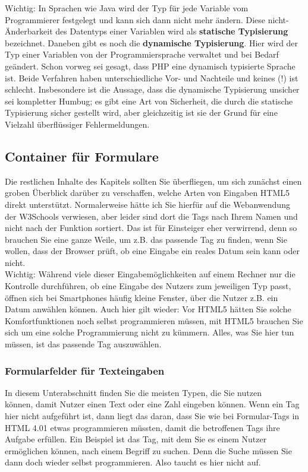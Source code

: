 Wichtig: In Sprachen wie Java wird der Typ für jede Variable vom Programmierer festgelegt und kann sich dann nicht mehr ändern. Diese nicht-Änderbarkeit des Datentyps einer Variablen wird als \textbf{statische Typisierung} bezeichnet. Daneben gibt es noch die \textbf{dynamische Typisierung}. Hier wird der Typ einer Variablen von der Programmiersprache verwaltet und bei Bedarf geändert. Schon vorweg sei gesagt, dass PHP eine dynamisch typisierte Sprache ist. Beide Verfahren haben unterschiedliche Vor- und Nachteile und keines (!) ist schlecht. Insbesondere ist die Aussage, dass die dynamische Typisierung unsicher sei kompletter Humbug; es gibt eine Art von Sicherheit, die durch die statische Typisierung sicher gestellt wird, aber gleichzeitig ist sie der Grund für eine Vielzahl überflüssiger Fehlermeldungen.

\subsection{Container für Formulare}

Die restlichen Inhalte des Kapitels sollten Sie überfliegen, um sich zunächst einen groben Überblick darüber zu verschaffen, welche Arten von Eingaben HTML5 direkt unterstützt. Normalerweise hätte ich Sie hierfür auf die Webanwendung der W3Schools verwiesen, aber leider sind dort die Tags nach Ihrem Namen und nicht nach der Funktion sortiert. Das ist für Einsteiger eher verwirrend, denn so brauchen Sie eine ganze Weile, um z.B. das passende Tag zu finden, wenn Sie wollen, dass der Browser prüft, ob eine Eingabe ein reales Datum sein kann oder nicht.\\

Wichtig: Während viele dieser Eingabemöglichkeiten auf einem Rechner nur die Kontrolle durchführen, ob eine Eingabe des Nutzers zum jeweiligen Typ passt, öffnen sich bei Smartphones häufig kleine Fenster, über die Nutzer z.B. ein Datum anwählen können. Auch hier gilt wieder: Vor HTML5 hätten Sie solche Komfortfunktionen noch selbst programmieren müssen, mit HTML5 brauchen Sie sich um eine solche Programmierung nicht zu kümmern. Alles, was Sie hier tun müssen, ist das passende Tag auszuwählen.

\subsubsection{Formularfelder für Texteingaben}

In diesem Unterabschnitt finden Sie die meisten Typen, die Sie nutzen \\können, damit Nutzer einen Text oder eine Zahl eingeben können. Wenn ein Tag hier nicht aufgeführt ist, dann liegt das daran, dass Sie wie bei Formular-Tags in HTML 4.01 etwas programmieren müssten, damit die betroffenen Tags ihre Aufgabe erfüllen. Ein Beispiel ist das Tag, mit dem Sie es einem Nutzer ermöglichen können, nach einem Begriff zu suchen. Denn die Suche müssen Sie dann doch wieder selbst programmieren. Also taucht es hier nicht auf.

